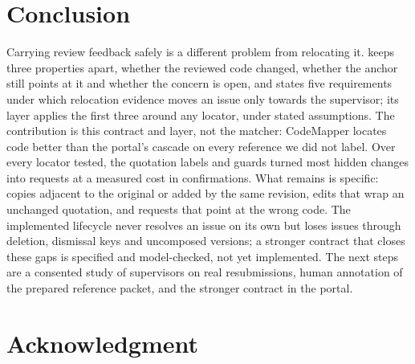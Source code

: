 \section{Conclusion}
Carrying review feedback safely is a different problem from relocating it. \sys{} keeps three properties apart, whether the reviewed code changed, whether the anchor still points at it and whether the concern is open, and states five requirements under which relocation evidence moves an issue only towards the supervisor; its layer applies the first three around any locator, under stated assumptions. The contribution is this contract and layer, not the matcher: CodeMapper locates code better than the portal's cascade on every reference we did not label. Over every locator tested, the quotation labels and guards turned most hidden changes into requests at a measured cost in confirmations. What remains is specific: copies adjacent to the original or added by the same revision, edits that wrap an unchanged quotation, and requests that point at the wrong code. The implemented lifecycle never resolves an issue on its own but loses issues through deletion, dismissal keys and uncomposed versions; a stronger contract that closes these gaps is specified and model-checked, not yet implemented. The next steps are a consented study of supervisors on real resubmissions, human annotation of the prepared reference packet, and the stronger contract in the portal.

\section*{Acknowledgment}
\vAcknowledgment


